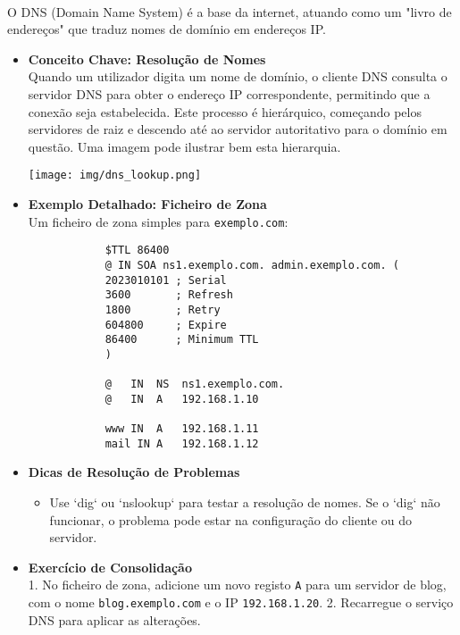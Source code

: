 \documentclass[10pt,a4paper]{article}
\begin{document}
	\paragraph{}
	O DNS (Domain Name System) é a base da internet, atuando como um "livro de endereços" que traduz nomes de domínio em endereços IP.
	
	\begin{itemize}
		\item \textbf{Conceito Chave: Resolução de Nomes} \\
		Quando um utilizador digita um nome de domínio, o cliente DNS consulta o servidor DNS para obter o endereço IP correspondente, permitindo que a conexão seja estabelecida. Este processo é hierárquico, começando pelos servidores de raiz e descendo até ao servidor autoritativo para o domínio em questão. Uma imagem pode ilustrar bem esta hierarquia.
		
		\begin{center}
			\texttt{[image: img/dns\_lookup.png]}
		\end{center}
		
		\item \textbf{Exemplo Detalhado: Ficheiro de Zona} \\
		Um ficheiro de zona simples para \texttt{exemplo.com}:
		\begin{verbatim}
			$TTL 86400
			@ IN SOA ns1.exemplo.com. admin.exemplo.com. (
			2023010101 ; Serial
			3600       ; Refresh
			1800       ; Retry
			604800     ; Expire
			86400      ; Minimum TTL
			)
			
			@   IN  NS  ns1.exemplo.com.
			@   IN  A   192.168.1.10
			
			www IN  A   192.168.1.11
			mail IN A   192.168.1.12
		\end{verbatim}
		
		\item \textbf{Dicas de Resolução de Problemas} \\
		\begin{itemize}
			\item Use `dig` ou `nslookup` para testar a resolução de nomes. Se o `dig` não funcionar, o problema pode estar na configuração do cliente ou do servidor.
		\end{itemize}
		
		\item \textbf{Exercício de Consolidação} \\
		1. No ficheiro de zona, adicione um novo registo \texttt{A} para um servidor de blog, com o nome \texttt{blog.exemplo.com} e o IP \texttt{192.168.1.20}.
		2. Recarregue o serviço DNS para aplicar as alterações.
	\end{itemize}
	
\end{document}

